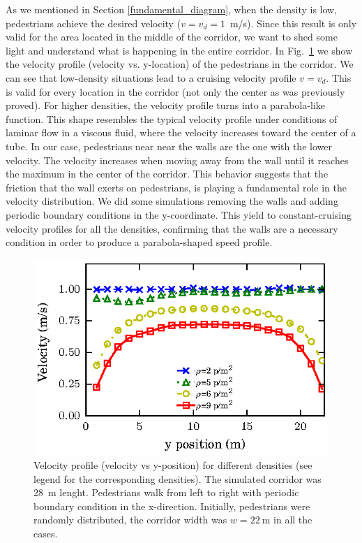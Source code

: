  As we mentioned in Section \ref{fundamental_diagram}, when the density is low, pedestrians achieve the desired velocity ($v=v_d=1$~m/s). Since this result is only valid for the area located in the middle of the corridor, we want to shed some light and understand what is happening in the entire corridor. In Fig.~\ref{speed-profile-w22} we show the velocity profile (velocity vs. y-location) of the pedestrians in the  corridor. We can see that low-density situations lead to a cruising velocity profile $v=v_d$. This is valid for every location in the corridor (not only the center as was previously proved). For higher densities, the velocity profile turns into a parabola-like function. This shape resembles the typical velocity profile under conditions of laminar flow in a viscous fluid, where the velocity increases toward the center of a tube. In our case, pedestrians near near the walls are the one with the lower velocity. The velocity increases when moving away from the wall until it reaches the maximum in the center of the corridor. This behavior suggests that the friction that the wall exerts on pedestrians, is playing a fundamental role in the velocity distribution. We did some simulations removing the walls and adding periodic boundary conditions in the y-coordinate. This yield to constant-cruising velocity profiles for all the densities, confirming that the walls are a necessary condition in order to produce a parabola-shaped speed profile.

\begin{figure}[htbp!]
\includegraphics[width=\columnwidth]
{plots/v(y)_width22_k24.eps}
\caption{\label{speed-profile-w22} Velocity profile (velocity vs y-position) for different densities (see legend for the corresponding densities). The simulated corridor was 28~m lenght. Pedestrians walk from left to right with periodic boundary condition in the x-direction. Initially, pedestrians were randomly distributed, the corridor width was $w = 22~$m in all the cases. }
\end{figure}

